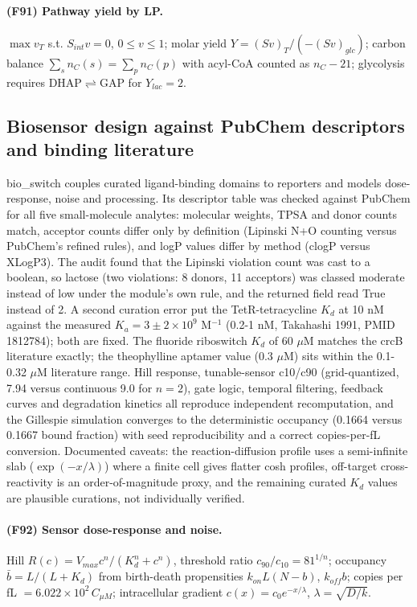 \paragraph{(F91) Pathway yield by LP.} $\max v_T$ s.t. $S_{int}v=0$, $0\le v\le 1$; molar yield $Y=(Sv)_T/(-(Sv)_{glc})$; carbon balance $\sum_s n_C(s)=\sum_p n_C(p)$ with acyl-CoA counted as $n_C-21$; glycolysis requires $\mathrm{DHAP}\rightleftharpoons\mathrm{GAP}$ for $Y_{lac}=2$.
\subsection{Biosensor design against PubChem descriptors and binding literature}
bio\_switch couples curated ligand-binding domains to reporters and models dose-response, noise and processing. Its descriptor table was checked against PubChem for all five small-molecule analytes: molecular weights, TPSA and donor counts match, acceptor counts differ only by definition (Lipinski N+O counting versus PubChem's refined rules), and logP values differ by method (clogP versus XLogP3). The audit found that the Lipinski violation count was cast to a boolean, so lactose (two violations: 8 donors, 11 acceptors) was classed moderate instead of low under the module's own rule, and the returned field read True instead of 2. A second curation error put the TetR-tetracycline $K_d$ at 10 nM against the measured $K_a=3\pm2\times10^9$ M$^{-1}$ (0.2-1 nM, Takahashi 1991, PMID 1812784); both are fixed. The fluoride riboswitch $K_d$ of 60 $\mu$M matches the crcB literature exactly; the theophylline aptamer value (0.3 $\mu$M) sits within the 0.1-0.32 $\mu$M literature range. Hill response, tunable-sensor c10/c90 (grid-quantized, 7.94 versus continuous 9.0 for $n=2$), gate logic, temporal filtering, feedback curves and degradation kinetics all reproduce independent recomputation, and the Gillespie simulation converges to the deterministic occupancy (0.1664 versus 0.1667 bound fraction) with seed reproducibility and a correct copies-per-fL conversion. Documented caveats: the reaction-diffusion profile uses a semi-infinite slab ($\exp(-x/\lambda)$) where a finite cell gives flatter cosh profiles, off-target cross-reactivity is an order-of-magnitude proxy, and the remaining curated $K_d$ values are plausible curations, not individually verified.
\paragraph{(F92) Sensor dose-response and noise.} Hill $R(c)=V_{max}c^n/(K_d^n+c^n)$, threshold ratio $c_{90}/c_{10}=81^{1/n}$; occupancy $\bar b=L/(L+K_d)$ from birth-death propensities $k_{on}L(N-b)$, $k_{off}b$; copies per fL $=6.022\times10^{2}\,C_{\mu M}$; intracellular gradient $c(x)=c_0 e^{-x/\lambda}$, $\lambda=\sqrt{D/k}$.
